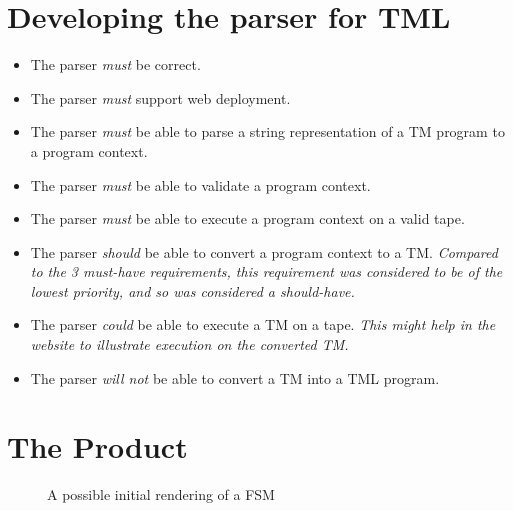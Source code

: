 \section{Developing the parser for TML}
\begin{itemize}
    \item The parser \emph{must} be correct.
    \item The parser \emph{must} support web deployment. 
    \item The parser \emph{must} be able to parse a string representation of a TM program to a program context.
    \item The parser \emph{must} be able to validate a program context.
    \item The parser \emph{must} be able to execute a program context on a valid tape.
    \item The parser \emph{should} be able to convert a program context to a TM. \textit{Compared to the 3 must-have requirements, this requirement was considered to be of the lowest priority, and so was considered a should-have.}
    \item The parser \emph{could} be able to execute a TM on a tape. \textit{This might help in the website to illustrate execution on the converted TM.}
    \item The parser \emph{will not} be able to convert a TM into a TML program.
\end{itemize}

\section{The Product}

\begin{figure}[htb]
    \centering
    \caption{A possible initial rendering of a FSM}
    \label{fig:bad_FSM}
\end{figure}


